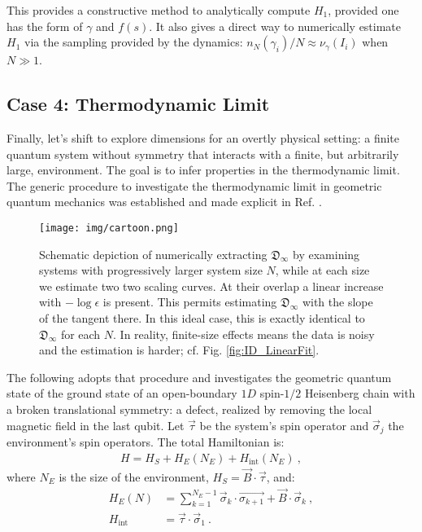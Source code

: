 \documentclass[draft,nofootinbib,pre,twocolumn,showkeys,superscriptaddress,preprintnumbers,floatfix]{revtex4-1}
\newcommand{\1}{\mathbbm{1}}
\newcommand{\DD}{\mathfrak{D}}
\begin{document}
This provides a constructive method to analytically compute $H_1$, provided one
has the form of $\gamma$ and $f(s)$. It also gives a direct way to numerically
estimate $H_1$ via the sampling provided by the dynamics: $n_N(\gamma_i) / N
\approx \nu_\gamma(I_i)$ when $N \gg 1$.

\subsection{Case 4: Thermodynamic Limit}
\label{sec:Example4}

Finally, let's shift to explore dimensions for an overtly physical setting: a
finite quantum system without symmetry that interacts with a finite, but
arbitrarily large, environment. The goal is to infer properties in the
thermodynamic limit. The generic procedure to investigate the thermodynamic
limit in geometric quantum mechanics was established and made explicit in Ref.
\cite{Anza20a}.

\begin{figure}[h]
\centering
\texttt{[image: img/cartoon.png]}
\caption{Schematic depiction of numerically extracting $\DD_{\infty}$ by
	examining systems with progressively larger system size $N$, while at each
	size we estimate two two scaling curves. At their overlap a linear increase
	with $-\log \epsilon$ is present. This permits estimating $\DD_{\infty}$
	with the slope of the tangent there. In this ideal case, this is exactly
	identical to $\DD_{\infty}$ for each $N$. In reality, finite-size effects
	means the data is noisy and the estimation is harder; cf. Fig.
	\ref{fig:ID_LinearFit}.
	}
\label{fig:cartoon} 
\end{figure}

The following adopts that procedure and investigates the geometric quantum
state of the ground state of an open-boundary $1D$ spin-$1/2$ Heisenberg chain
with a broken translational symmetry: a defect, realized by removing the local
magnetic field in the last qubit. Let $\vec{\tau}$ be the system's spin
operator and $\vec{\sigma}_j$ the environment's spin operators. The total
Hamiltonian is:
\begin{align*}
H = H_S + H_E(N_E) + H_{\mathrm{int}}(N_E)
  ~,
\end{align*}
where $N_E$ is the size of the environment, $H_S = \vec{B}\cdot \vec{\tau}$, and:
\begin{align}
H_E(N) & =  \sum_{k=1}^{N_E-1} \vec{\sigma}_k \cdot \vec{\sigma_{k+1}}
  + \vec{B} \cdot \vec{\sigma}_k~, \nonumber\\
  H_{\mathrm{int}} & = \vec{\tau} \cdot \vec{\sigma}_1
  ~.
\label{eq:Heis}
\end{align}
\end{document}
